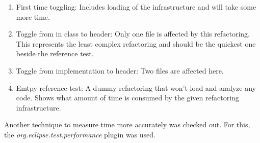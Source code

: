 \begin{enumerate}
\item First time toggling: Includes loading of the infrastructure and will take 
some more time.
\item Toggle from in class to header: Only one file is affected by this 
refactoring. This represents the least complex refactoring and should be the 
quickest one beside the reference test.
\item Toggle from implementation to header: Two files are affected here.
\item Emtpy reference test: A dummy refactoring that won't load and analyze any 
code. Shows what amount of time is consumed by the given refactoring 
infrastructure.
\end{enumerate}

Another technique to measure time more accurately was checked out. For this, the 
\textit{org.eclipse.test.performance} plugin was used. 


